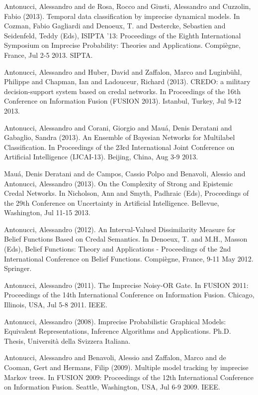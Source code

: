 \begin{cventries}
\begin{cvitems}
\item Antonucci, Alessandro and de Rosa, Rocco and Giusti, Alessandro and Cuzzolin, Fabio (2013).   Temporal data classification by imprecise dynamical models.   In Cozman, Fabio Gagliardi and Denoeux, T. and Destercke, Sebastien and Seidenfeld, Teddy (Eds), ISIPTA ’13: Proceedings of the Eighth International Symposium on Imprecise Probability: Theories and Applications.   Compiègne, France,   Jul 2-5 2013.   SIPTA.
\item Antonucci, Alessandro and Huber, David and Zaffalon, Marco and Luginbühl, Philippe and Chapman, Ian and Ladouceur, Richard (2013).   CREDO: a military decision-support system based on credal networks.   In Proceedings of the 16th Conference on Information Fusion (FUSION 2013).   Istanbul, Turkey,   Jul 9-12 2013.
\item Antonucci, Alessandro and Corani, Giorgio and Mauá, Denis Deratani and Gabaglio, Sandra (2013).   An Ensemble of Bayesian Networks for Multilabel Classification.   In Proceedings of the 23rd International Joint Conference on Artificial Intelligence (IJCAI-13).   Beijing, China,   Aug 3-9 2013.
\item Mauá, Denis Deratani and de Campos, Cassio Polpo and Benavoli, Alessio and Antonucci, Alessandro (2013).   On the Complexity of Strong and Epistemic Credal Networks.   In Nicholson, Ann and Smyth, Padhraic (Eds), Proceedings of the 29th Conference on Uncertainty in Artificial Intelligence.   Bellevue, Washington,   Jul 11-15 2013.
\item Antonucci, Alessandro (2012).   An Interval-Valued Dissimilarity Measure for Belief Functions Based on Credal Semantics.   In Denoeux, T. and M.H., Masson (Eds), Belief Functions: Theory and Applications - Proceedings of the 2nd International Conference on Belief Functions.   Compiègne, France,   9-11 May 2012.   Springer.
\item Antonucci, Alessandro (2011).   The Imprecise Noisy-OR Gate.   In FUSION 2011: Proceedings of the 14th International Conference on Information Fusion.   Chicago, Illinois, USA,   Jul 5-8 2011.   IEEE.
\item Antonucci, Alessandro (2008).   Imprecise Probabilistic Graphical Models: Equivalent Representations, Inference Algorithms and Applications.   Ph.D. Thesis, Università della Svizzera Italiana.
\item Antonucci, Alessandro and Benavoli, Alessio and Zaffalon, Marco and de Cooman, Gert and Hermans, Filip (2009).   Multiple model tracking by imprecise Markov trees.   In FUSION 2009: Proceedings of the 12th International Conference on Information Fusion.   Seattle, Washington, USA,   Jul 6-9 2009.   IEEE.

\end{cvitems}
\end{cventries}
